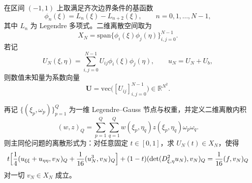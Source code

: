 \documentclass[11pt,a4paper]{article}
\begin{document}
在区间 $(-1,1)$ 上取满足齐次边界条件的基函数
\begin{equation}
\phi_n(\xi)=L_n(\xi)-L_{n+2}(\xi),
\qquad n=0,1,\dots,N-1,
\label{eq:phi}
\end{equation}
其中 $L_n$ 为 Legendre 多项式。二维离散空间取为
\begin{equation}
X_N=\mathrm{span}\{\phi_i(\xi)\phi_j(\eta)\}_{i,j=0}^{N-1}.
\label{eq:space}
\end{equation}
若记
\begin{equation}
U_N(\xi,\eta)=\sum_{i,j=0}^{N-1}U_{ij}\phi_i(\xi)\phi_j(\eta),
\qquad
u_N=U_N+U_b,
\label{eq:UN}
\end{equation}
则数值未知量为系数向量
\[
\bm U=\mathrm{vec}\bigl([U_{ij}]_{i,j=0}^{N-1}\bigr)\in \mathbb{R}^{N^2}.
\]

再记 $\{(\xi_p,\omega_p)\}_{p=1}^Q$ 为一维 Legendre--Gauss 节点与权重，并定义二维离散内积
\begin{equation}
(w,z)_Q=\sum_{p=1}^Q\sum_{q=1}^Q w(\xi_p,\eta_q)z(\xi_p,\eta_q)\omega_p\omega_q.
\label{eq:quad}
\end{equation}
则主同伦问题的离散形式为：对任意固定 $t\in[0,1]$，求 $U_N(t)\in X_N$，使得
\begin{equation}
t\Bigl[\frac14(u_{\xi\xi}+u_{\eta\eta},v_N)_Q+\frac1{16}(u_N^3,v_N)_Q\Bigr]
+(1-t)(\det(D^2_{\xi,\eta}u_N),v_N)_Q
=\frac1{16}(f,v_N)_Q
\label{eq:weak}
\end{equation}
对一切 $v_N\in X_N$ 成立。
\end{document}
